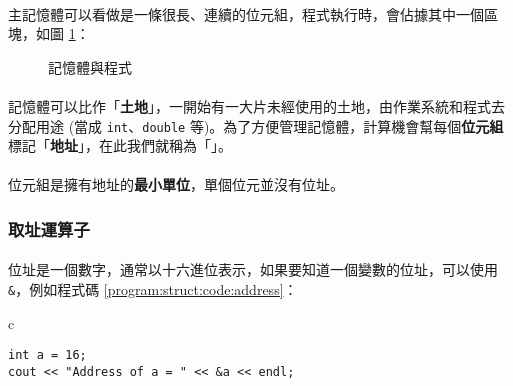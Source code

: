 \documentclass[12pt,a4paper,oneside]{report}
\begin{document}
\begin{CJK}{UTF8}{bkai}
\paragraph{}主記憶體可以看做是一條很長、連續的位元組，程式執行時，會佔據其中一個區塊，如圖 \ref{program:struct:fig:memory:and:program}：

\begin{figure}[h!]
\centering
{}
\caption{記憶體與程式}
\label{program:struct:fig:memory:and:program}
\end{figure}

\paragraph{}記憶體可以比作「\textbf{土地}」，一開始有一大片未經使用的土地，由作業系統和程式去分配用途 (當成 \lstinline!int!、\lstinline!double! 等)。為了方便管理記憶體，計算機會幫每個{\color{blue}\textbf{位元組}}標記「\textbf{地址}」，在此我們就稱為「」。
\paragraph{}位元組是擁有地址的{\color{blue}\textbf{最小單位}}，單個位元並沒有位址。

\subsubsection{取址運算子}

\paragraph{}位址是一個數字，通常以十六進位表示，如果要知道一個變數的位址，可以使用 \lstinline!&!，例如程式碼 \ref{program:struct:code:address}：

\begin{code}[h!]
\centering
\begin{tabular}{c}
\begin{lstlisting}
int a = 16;
cout << "Address of a = " << &a << endl;
\end{lstlisting}
\end{tabular}
\caption{印出 \lstinline!a! 的位址}
\label{program:struct:code:address}
\end{code}


\end{CJK}
\end{document}
